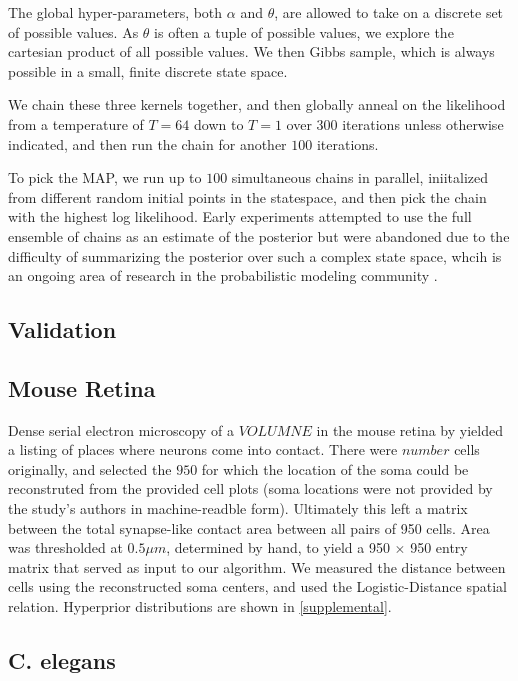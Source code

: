 \documentclass{article}
\begin{document}
The global hyper-parameters, both $\alpha$ and $\theta$, are allowed
to take on a discrete set of possible values. As $\theta$ is often a
tuple of possible values, we explore the cartesian product of all
possible values. We then Gibbs sample, which is always possible in a 
small, finite discrete state space. 

We chain these three kernels together, and then globally
anneal on the likelihood from a temperature of $T=64$ down to 
$T=1$ over 300 iterations unless otherwise indicated, and
then run the chain for another $100$ iterations. 

To pick the MAP, we run up to $100$ simultaneous chains in parallel,
iniitalized from different random initial points in the statespace,
and then pick the chain with the highest log likelihood. Early
experiments attempted to use the full ensemble of chains as an
estimate of the posterior but were abandoned due to the difficulty of
summarizing the posterior over such a complex state space, whcih is an
ongoing area of research in the probabilistic modeling community
\autocite{}.


\subsection{Validation}


\subsection {Mouse Retina}
Dense serial electron microscopy of a $VOLUMNE$ in the mouse retina by
\autocite{Helmstaedter2013} yielded a listing of places where neurons
come into contact. There were $number$ cells originally, and selected
the $950$ for which the location of the soma could be reconstruted
from the provided cell plots (soma locations were not provided by the
study's authors in machine-readble form). Ultimately
this left a matrix between the total synapse-like contact area between
all pairs of 950 cells. Area was thresholded at $0.5\mu m$, determined
by hand, to yield a 950 $\times$ 950 entry matrix that served as input
to our algorithm. We measured the distance between cells using
the reconstructed soma centers, and used the Logistic-Distance
spatial relation. Hyperprior distributions are shown in \ref{supplemental}. 

\subsection{C. elegans}
\end{document}
